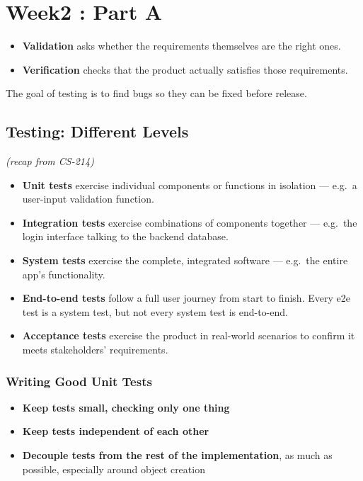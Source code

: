 \chapter{Week2 : Part A}

\begin{defnbox}[title=Validation vs.\ Verification]
\begin{itemize}
  \item \textbf{Validation} asks whether the requirements themselves are the right ones.
  \item \textbf{Verification} checks that the product actually satisfies those requirements.
\end{itemize}
\tcblower
The goal of testing is to find bugs so they can be fixed before release.
\end{defnbox}

\section{Testing: Different Levels}
\textit{(recap from CS-214)}

\begin{itemize}
  \item \textbf{Unit tests} exercise individual components or functions in isolation --- e.g.\ a user-input validation function.
  \item \textbf{Integration tests} exercise combinations of components together --- e.g.\ the login interface talking to the backend database.
  \item \textbf{System tests} exercise the complete, integrated software --- e.g.\ the entire app's functionality.
  \item \textbf{End-to-end tests} follow a full user journey from start to finish. Every e2e test is a system test, but not every system test is end-to-end.
  \item \textbf{Acceptance tests} exercise the product in real-world scenarios to confirm it meets stakeholders' requirements.
\end{itemize}

\subsection{Writing Good Unit Tests}

\begin{itemize}
  \item \textbf{Keep tests small, checking only one thing}
  \item \textbf{Keep tests independent of each other}
  \item \textbf{Decouple tests from the rest of the implementation}, as much as possible, especially around object creation
\end{itemize}

